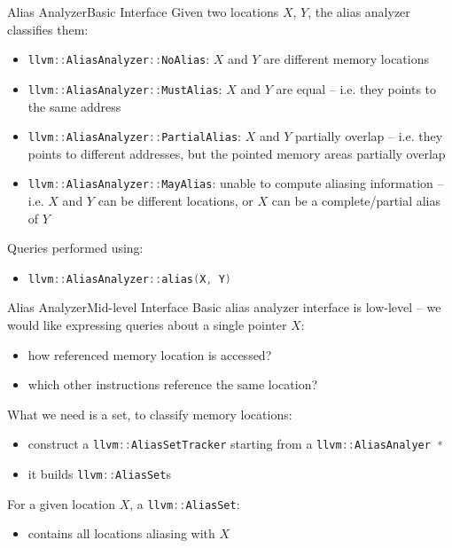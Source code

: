 \documentclass[10pt,mathserif]{beamer}
\newcommand{\cppinline}[1]{\lstinline[language=C++]!#1!}
\begin{document}
\begin{frame}{Alias Analyzer}{Basic Interface}
Given two locations $X$, $Y$, the alias analyzer classifies them:

\begin{itemize}
\item \cppinline{llvm::AliasAnalyzer::NoAlias}: $X$ and $Y$ are different
      memory locations
\item \cppinline{llvm::AliasAnalyzer::MustAlias}: $X$ and $Y$ are equal -- i.e.
      they points to the same address
\item \cppinline{llvm::AliasAnalyzer::PartialAlias}: $X$ and $Y$ partially
      overlap -- i.e. they points to different addresses, but the pointed memory
      areas partially overlap
\item \cppinline{llvm::AliasAnalyzer::MayAlias}: unable to compute aliasing
      information -- i.e. $X$ and $Y$ can be different locations, or $X$ can be
      a complete/partial alias of $Y$
\end{itemize}

Queries performed using:

\begin{itemize}
\item \cppinline{llvm::AliasAnalyzer::alias(X, Y)}
\end{itemize}
\end{frame}

\begin{frame}{Alias Analyzer}{Mid-level Interface}
Basic alias analyzer interface is low-level -- we would like expressing queries
about a single pointer $X$:

\begin{itemize}
\item how referenced memory location is accessed?
\item which other instructions reference the same location?
\end{itemize}

What we need is a set, to classify memory locations:

\begin{itemize}
\item construct a \cppinline{llvm::AliasSetTracker} starting from a
      \cppinline{llvm::AliasAnalyer *}
\item it builds \cppinline{llvm::AliasSet}s
\end{itemize}

For a given location $X$, a \cppinline{llvm::AliasSet}:

\begin{itemize}
\item contains all locations aliasing with $X$
\end{itemize}
\end{frame}
\end{document}
